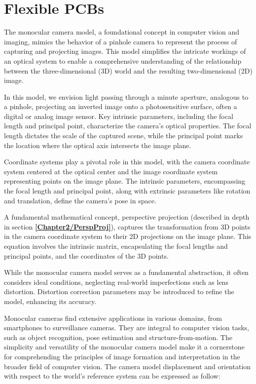 \section{Flexible PCBs}
The monocular camera model, a foundational concept in computer vision and imaging, mimics the behavior of a pinhole camera to represent the process of capturing and projecting images. This model simplifies the intricate workings of an optical system to enable a comprehensive understanding of the relationship between the three-dimensional (3D) world and the resulting two-dimensional (2D) image.

In this model, we envision light passing through a minute aperture, analogous to a pinhole, projecting an inverted image onto a photosensitive surface, often a digital or analog image sensor. Key intrinsic parameters, including the focal length and principal point, characterize the camera's optical properties. The focal length dictates the scale of the captured scene, while the principal point marks the location where the optical axis intersects the image plane.

Coordinate systems play a pivotal role in this model, with the camera coordinate system centered at the optical center and the image coordinate system representing points on the image plane. The intrinsic parameters, encompassing the focal length and principal point, along with extrinsic parameters like rotation and translation, define the camera's pose in space.

A fundamental mathematical concept, perspective projection (described in depth in section \textbf{\ref{Chapter2/PerspProj}}), captures the transformation from 3D points in the camera coordinate system to their 2D projections on the image plane. This equation involves the intrinsic matrix, encapsulating the focal lengths and principal points, and the coordinates of the 3D points.

While the monocular camera model serves as a fundamental abstraction, it often considers ideal conditions, neglecting real-world imperfections such as lens distortion. Distortion correction parameters may be introduced to refine the model, enhancing its accuracy.

Monocular cameras find extensive applications in various domains, from smartphones to surveillance cameras. They are integral to computer vision tasks, such as object recognition, pose estimation and structure-from-motion. The simplicity and versatility of the monocular camera model make it a cornerstone for comprehending the principles of image formation and interpretation in the broader field of computer vision.
\newpage
The camera model displacement and orientation with respect to the world's reference system can be expressed as follow:


